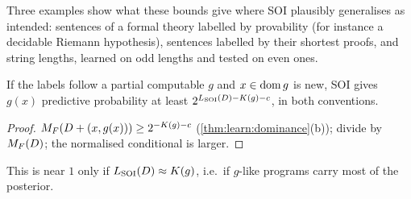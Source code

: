 Three examples show what these bounds give where SOI plausibly generalises as intended: sentences of a formal theory labelled by provability (for instance a decidable Riemann hypothesis), sentences labelled by their shortest proofs, and string lengths, learned on odd lengths and tested on even ones.

\begin{proposition}\label{prop:ood:intended}
If the labels follow a partial computable $g$ and $x\in\operatorname{dom} g$ is new, SOI gives $g(x)$ predictive probability at least $2^{L_{\mathrm{SOI}}(D)-K(g)-c}$, in both conventions.
\end{proposition}

\begin{proof}
$M_{F}(D+(x,g(x)))\ge2^{-K(g)-c}$ (\cref{thm:learn:dominance}(b)); divide by $M_{F}(D)$; the normalised conditional is larger.
\end{proof}

This is near $1$ only if $L_{\mathrm{SOI}}(D)\approx K(g)$, i.e.\ if $g$-like programs carry most of the posterior.

